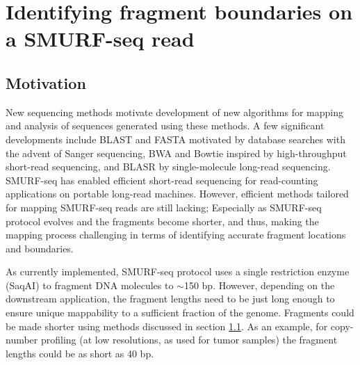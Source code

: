
\chapter{Identifying fragment boundaries on a SMURF-seq read}
\label{ch4}

\section{Motivation}
New sequencing methods motivate development of new algorithms for
mapping and analysis of sequences generated using these methods. A few
significant developments include BLAST \cite{altschul1990basic} and
FASTA \cite{pearson1988improved} motivated by database searches with the
advent of Sanger sequencing, BWA \cite{li2009fast} and Bowtie
\cite{langmead2009ultrafast} inspired by high-throughput short-read
sequencing, and BLASR \cite{chaisson2012mapping} by single-molecule
long-read sequencing.
SMURF-seq has enabled efficient short-read sequencing for read-counting
applications on portable long-read machines.  However, efficient methods
tailored for mapping SMURF-seq reads are still lacking; Especially as
SMURF-seq protocol evolves and the fragments become shorter, and thus,
making the mapping process challenging in terms of identifying accurate
fragment locations and boundaries.

As currently implemented, SMURF-seq protocol uses a single restriction
enzyme (SaqAI) to fragment DNA molecules to $\sim$150 bp. However,
depending on the downstream application, the fragment lengths need to be
just long enough to ensure unique mappability to a sufficient fraction
of the genome.
Fragments could be made shorter using methods discussed in section
\ref{}.  As an example, for copy-number profiling (at low
resolutions, as used for tumor samples) the fragment lengths could be as
short as 40 bp.

